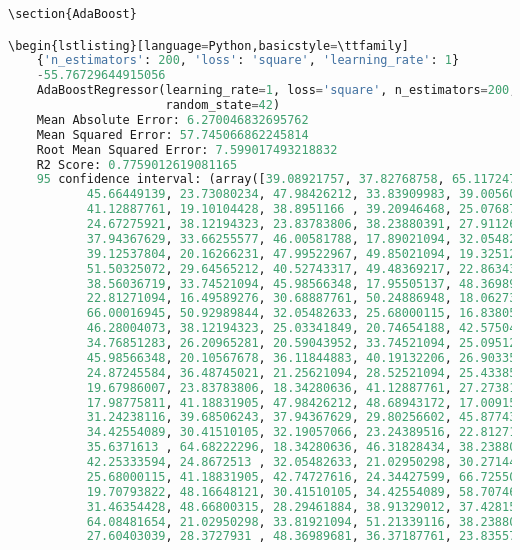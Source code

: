 \documentclass{article}
\begin{document}
\begin{lstlisting}[language=Python,basicstyle=\ttfamily]
\section{AdaBoost}

\begin{lstlisting}[language=Python,basicstyle=\ttfamily]
    {'n_estimators': 200, 'loss': 'square', 'learning_rate': 1}
    -55.76729644915056
    AdaBoostRegressor(learning_rate=1, loss='square', n_estimators=200,
                      random_state=42)
    Mean Absolute Error: 6.270046832695762
    Mean Squared Error: 57.745066862245814
    Root Mean Squared Error: 7.599017493218832
    R2 Score: 0.7759012619081165
    95 confidence interval: (array([39.08921757, 37.82768758, 65.11724798, 34.42554089, 20.11937125,
           45.66449139, 23.73080234, 47.98426212, 33.83909983, 39.00560777,
           41.12887761, 19.10104428, 38.8951166 , 39.20946468, 25.07687761,
           24.67275921, 38.12194323, 23.83783806, 38.23880391, 27.91126358,
           37.94367629, 33.66255577, 46.00581788, 17.89021094, 32.05482633,
           39.12537804, 20.16266231, 47.99522967, 49.85021094, 19.32512004,
           51.50325072, 29.64565212, 40.52743317, 49.48369217, 22.86343317,
           38.56036719, 33.74521094, 45.98566348, 17.95505137, 48.36989681,
           22.81271094, 16.49589276, 30.68887761, 50.24886948, 18.06273431,
           66.00016945, 50.92989844, 32.05482633, 25.68000115, 16.83805577,
           46.28004073, 38.12194323, 25.03341849, 20.74654188, 42.57504128,
           34.76851283, 26.20965281, 20.59043952, 33.74521094, 25.09512523,
           45.98566348, 20.10567678, 36.11844883, 40.19132206, 26.90335815,
           24.87245584, 36.48745021, 21.25621094, 28.52521094, 25.43385501,
           19.67986007, 23.83783806, 18.34280636, 41.12887761, 27.2738156 ,
           17.98775811, 41.18831905, 47.98426212, 48.68943172, 17.00915831,
           31.24238116, 39.68506243, 37.94367629, 29.80256602, 45.87743921,
           34.42554089, 30.41510105, 32.19057066, 23.24389516, 22.81271094,
           35.6371613 , 64.68222296, 18.34280636, 46.31828434, 38.23880391,
           42.25333594, 24.8672513 , 32.05482633, 21.02950298, 30.27144442,
           25.68000115, 41.18831905, 42.74727616, 24.34427599, 66.72550506,
           19.70793822, 48.16648121, 30.41510105, 34.42554089, 58.70746225,
           31.46354428, 48.66800315, 28.29461884, 38.91329012, 37.42815212,
           64.08481654, 21.02950298, 33.81921094, 51.21339116, 38.23880391,
           27.60403039, 28.3727931 , 48.36989681, 36.37187761, 23.83557937,

\end{lstlisting}
\end{document}
